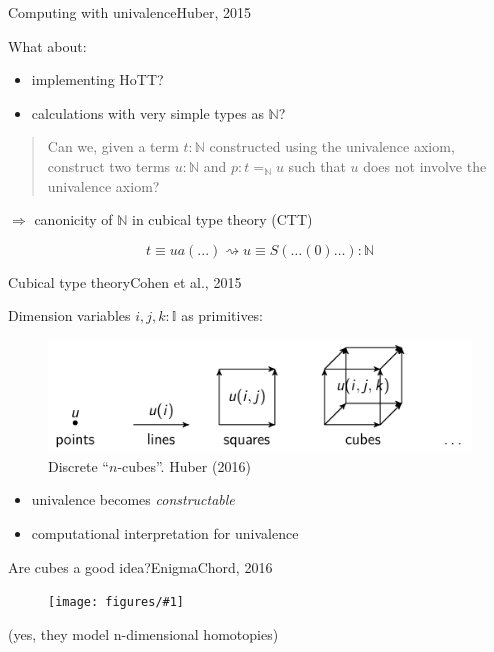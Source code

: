 \documentclass[english,draft]{beamer}
\newcommand{\fig}[2]{
    \begin{figure}\begin{center}\texttt{[image: figures/\#1]}\caption{#2\label{#1}}\end{center}
    \end{figure}}
\begin{document}
\begin{frame}{Computing with univalence}{Huber, 2015}

What about:
\begin{itemize}
\item implementing HoTT?
\item calculations with very simple types as $\mathbb{N}$?
\end{itemize}

\begin{quotation}
Can we, given a term $t: \mathbb{N}$ constructed using the univalence axiom, construct two terms $u : \mathbb{N}$ and $p : t =_{\mathbb{N}} u$ such that $u$ does not involve the univalence axiom?
\end{quotation}

\pause

 $\Rightarrow$ canonicity of $\mathbb{N}$ in cubical type theory (CTT)

$$ t \equiv ua ( ... )  \rightsquigarrow u \equiv S ( \dots ( 0 ) \ldots ) : \mathbb{N}  $$


\end{frame}


\begin{frame}{Cubical type theory}{Cohen et al., 2015}

Dimension variables $i,j,k : \mathbb{I}$ as primitives:

\begin{figure}[h!]
    \includegraphics[width=.7\textwidth]{figures/cubes.png}
    \caption{Discrete ``$n$-cubes''. Huber (2016)}
\end{figure}

\begin{itemize}
\item univalence becomes \emph{constructable}
\item computational interpretation for univalence 
\end{itemize}

\end{frame}


\begin{frame}{Are cubes a good idea?}{EnigmaChord, 2016}

\fig{cube-joke.jpg}{}

\pause

(yes, they model n-dimensional homotopies)

\end{frame}
\end{document}
